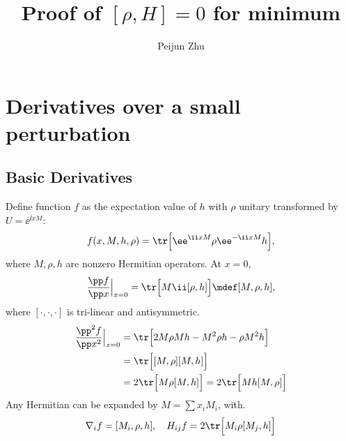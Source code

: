 \documentclass[10pt]{article}
\title{Proof of $[\rho, H]= 0$ for minimum}
\author{Peijun Zhu}
\begin{document}
\maketitle

\section{Derivatives over a small perturbation}
\subsection{Basic Derivatives}
Define function $f$ as the expectation value of $h$ with $\rho$ unitary transformed by $U=\ee^{\ii xM}$:
\begin{equation}
f(x, M, h, \rho)=\tr \Big[\ee^{\ii xM}\rho \ee^{-\ii xM}h\Big],
\end{equation}
where $M, \rho, h$ are nonzero Hermitian operators. At $x=0$,
\[\frac{\pp f}{\pp x}\Big|_{x=0}=\tr \Big[M\ii [\rho, h]\Big]\mdef [M, \rho, h],\]
where $[\cdot, \cdot, \cdot]$ is tri-linear and antisymmetric.
\begin{align}
\frac{\pp^2 f}{\pp x^2}\Big|_{x=0}&=\tr \Big[2M\rho Mh-M^2\rho h-\rho M^2h\Big]\\
&=\tr \Big[[M,\rho][M, h]\Big]\\
&=2\tr \Big[M\rho [M, h]\Big]=2\tr \Big[Mh [M, \rho]\Big]
\end{align}
Any Hermitian can be expanded by $M=\sum x_iM_i$, with. 
\begin{equation}
\nabla_i f=[M_i,\rho, h], \quad H_{ij}f=2\tr \Big[M_i\rho[M_j, h]\Big]
\end{equation}
\end{document}
